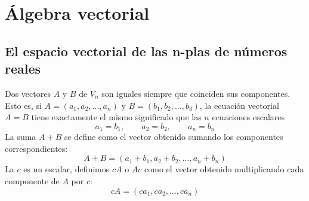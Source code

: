 \chapter{Álgebra vectorial}


\setcounter{section}{1}
\section{El espacio vectorial de las n-plas de números reales}

\begin{tcolorbox}
    \begin{def.} Dos vectores $A$ y $B$ de $V_n$ son iguales siempre que coinciden sus componentes. Esto es, si $A=(a_1,a_2,...,a_n)$ y $B=(b_1,b_2,...,b_3)$, la ecuación vectorial $A=B$ tiene exactamente el mismo significado que las $n$ ecuaciones escalares $$a_1=b_1, \qquad a_2=b_2, \qquad a_n=b_n$$
    La suma $A+B$ se define como el vector obtenido sumando los componentes correspondientes: $$A+B = (a_1+b_1,a_2+b_2,...,a_n+b_n)$$
    La $c$ es un escalar, definimos $cA$ o $Ac$ como el vector obtenido multiplicando cada componente de $A$ por $c$: $$cA=(ca_1,ca_2,...,ca_n)$$
    \end{def.}
\end{tcolorbox}

